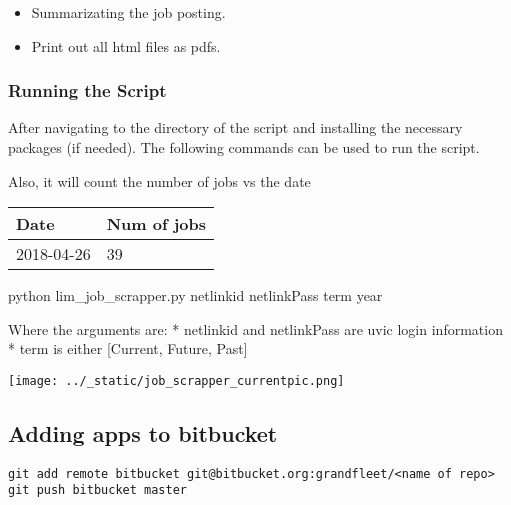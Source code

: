 \begin{itemize}

\item
  Summarizating the job posting.
\item
  Print out all html files as pdfs.
\end{itemize}


\subsubsection{Running the Script}\label{running-the-script}

After navigating to the directory of the script and installing the
necessary packages (if needed). The following commands can be used to
run the script.

Also, it will count the number of jobs vs the date

\begin{longtable}[]{@{}ll@{}}
\toprule
\begin{minipage}[b]{0.20\columnwidth}\raggedright
Date\strut
\end{minipage} & \begin{minipage}[b]{0.21\columnwidth}\raggedright
Num of jobs\strut
\end{minipage}\tabularnewline
\midrule
\endhead
\begin{minipage}[t]{0.20\columnwidth}\raggedright
2018-04-26\strut
\end{minipage} & \begin{minipage}[t]{0.21\columnwidth}\raggedright
39\strut
\end{minipage}\tabularnewline
\bottomrule
\end{longtable}

\begin{Shaded}
python  lim\_job\_scrapper.py netlinkid netlinkPass term year 
\end{Shaded}

Where the arguments are: * netlinkid and netlinkPass are uvic login
information * term is either {[}Current, Future, Past{]}

\texttt{[image: ../\_static/job\_scrapper\_currentpic.png]}


\subsection{Adding apps to bitbucket}\label{adding-apps-to-bitbucket}

\begin{verbatim}
git add remote bitbucket git@bitbucket.org:grandfleet/<name of repo>
git push bitbucket master
\end{verbatim}


